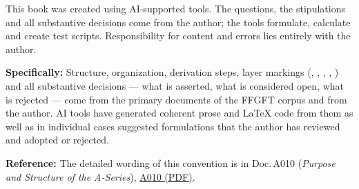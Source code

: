 
This book was created using AI-supported tools.
The questions, the stipulations and all substantive decisions
come from the author; the tools formulate, calculate and create
test scripts. Responsibility for content and errors lies entirely
with the author.

\medskip\noindent
\textbf{Specifically:} Structure, organization, derivation steps, layer markings
(\SETZ, \BB, \QQ, \Skizze, \HH) and all substantive decisions
--- what is asserted, what is considered open, what is rejected ---
come from the primary documents of the FFGFT corpus and from the author.
AI tools have generated coherent prose and LaTeX code from them
as well as in individual cases suggested formulations that the author
has reviewed and adopted or rejected.

\medskip\noindent
\textbf{Reference:} The detailed wording of this convention is in
Doc.\,A010 (\textit{Purpose and Structure of the A-Series}),
\href{https://github.com/jpascher/T0-Time-Mass-Duality/blob/main/A_Serie_Export/pdf/A010_Zweck_Aufbau_De.pdf}{A010 (PDF)}.